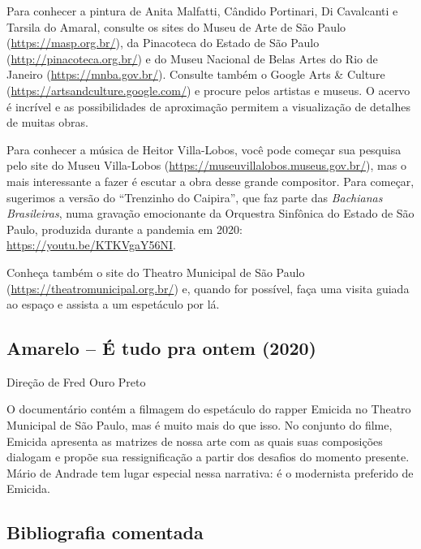 \documentclass[11pt]{extarticle}
\begin{document}
Para conhecer a pintura de Anita Malfatti, Cândido Portinari, Di
Cavalcanti e Tarsila do Amaral, consulte os sites do Museu de Arte de
São Paulo (\url{https://masp.org.br/}), da Pinacoteca do Estado de São
Paulo (\url{http://pinacoteca.org.br/}) e do Museu Nacional de Belas
Artes do Rio de Janeiro (\url{https://mnba.gov.br/}). Consulte também o
Google Arts \& Culture (\url{https://artsandculture.google.com/}) e
procure pelos artistas e museus. O acervo é incrível e as possibilidades
de aproximação permitem a visualização de detalhes de muitas obras.

Para conhecer a música de Heitor Villa-Lobos, você pode começar sua
pesquisa pelo site do Museu Villa-Lobos
(\url{https://museuvillalobos.museus.gov.br/}), mas o mais interessante
a fazer é escutar a obra desse grande compositor. Para começar,
sugerimos a versão do ``Trenzinho do Caipira'', que faz parte das
\emph{Bachianas Brasileiras}, numa gravação emocionante da Orquestra
Sinfônica do Estado de São Paulo, produzida durante a pandemia em 2020:
\url{https://youtu.be/KTKVgaY56NI}.

Conheça também o site do Theatro Municipal de São Paulo
(\url{https://theatromunicipal.org.br/}) e, quando for possível, faça
uma visita guiada ao espaço e assista a um espetáculo por lá.

\subsection{Amarelo -- É tudo pra ontem (2020)}

Direção de Fred Ouro Preto

O documentário contém a filmagem do espetáculo do rapper Emicida no
Theatro Municipal de São Paulo, mas é muito mais do que isso. No
conjunto do filme, Emicida apresenta as matrizes de nossa arte com as
quais suas composições dialogam e propõe sua ressignificação a partir
dos desafios do momento presente. Mário de Andrade tem lugar especial
nessa narrativa: é o modernista preferido de Emicida.

\subsection{Bibliografia comentada}
\end{document}
